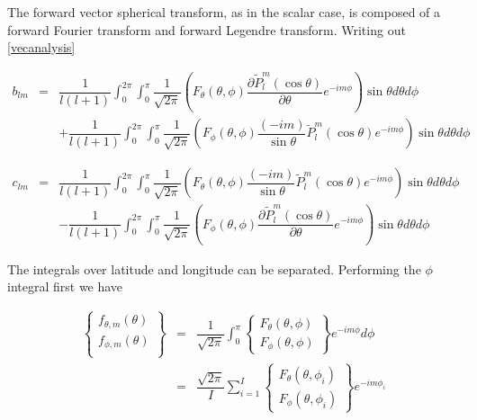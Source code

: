 The forward vector spherical transform, as in the scalar case, is composed of a forward Fourier transform and forward Legendre transform.  Writing out \eqref{vecanalysis}

\begin{eqnarray}
b_{lm} &=& \dfrac{1}{l(l+1)}\int_0^{2\pi} \int_0^{\pi} \dfrac{1}{\sqrt{2\pi}} \left( F_{\theta}(\theta,\phi) \dfrac{\partial \widetilde{P}_l^m(\cos\theta)}{\partial\theta} e^{-im\phi} \right) \sin\theta d\theta d\phi \nonumber \\
\ & \ & + \dfrac{1}{l(l+1)}\int_0^{2\pi} \int_0^{\pi} \dfrac{1}{\sqrt{2\pi}} \left( F_{\phi}(\theta,\phi) \dfrac{(-im)}{\sin\theta} \widetilde{P}_l^m(\cos\theta) e^{-im\phi} \right) \sin\theta d\theta d\phi 
\end{eqnarray}

\begin{eqnarray}
c_{lm} &=& \dfrac{1}{l(l+1)}\int_0^{2\pi} \int_0^{\pi} \dfrac{1}{\sqrt{2\pi}} \left( F_{\theta}(\theta,\phi) \dfrac{(-im)}{\sin\theta} \widetilde{P}_l^m(\cos\theta) e^{-im\phi} \right) \sin\theta d\theta d\phi \nonumber \\
\ & \ & - \dfrac{1}{l(l+1)}\int_0^{2\pi} \int_0^{\pi} \dfrac{1}{\sqrt{2\pi}} \left( F_{\phi}(\theta,\phi)\dfrac{\partial \widetilde{P}_l^m(\cos\theta)}{\partial\theta}  e^{-im\phi} \right) \sin\theta d\theta d\phi 
\end{eqnarray}

The integrals over latitude and longitude can be separated.  Performing the $\phi$ integral first we have 

\begin{eqnarray}
\left\{
\begin{array}{c}
f_{\theta,m}(\theta) \\
f_{\phi,m}(\theta) \\
\end{array}
\right\}
&=&
\dfrac{1}{\sqrt{2\pi}} 
\int_0^{\pi}
\left\{
\begin{array}{c}
F_{\theta}(\theta,\phi) \\
F_{\phi}(\theta,\phi) 
\end{array}\right\}
e^{-im\phi} d\phi  \\
\ &=&
\dfrac{\sqrt{2\pi}}{I}
\sum_{i=1}^I
\left\{
\begin{array}{c}
F_{\theta}(\theta,\phi_i) \\
F_{\phi}(\theta,\phi_i) 
\end{array}\right\}
e^{-im\phi_i} 
\end{eqnarray}

